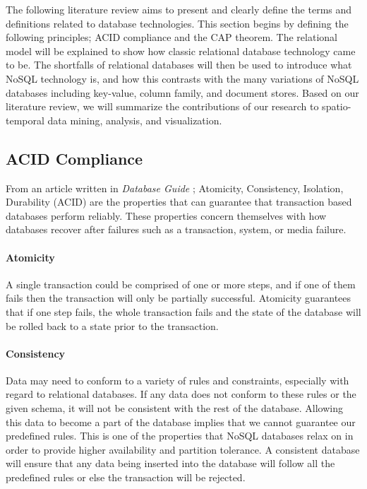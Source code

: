 The following literature review aims to present and clearly define the terms and definitions related to database technologies. This section begins by defining the following principles; ACID compliance and the CAP theorem. The relational model will be explained to show how classic relational database technology came to be. The shortfalls of relational databases will then be used to introduce what NoSQL technology is, and how this contrasts with the many variations of NoSQL databases including key-value, column family, and document stores. Based on our literature review, we will summarize the contributions of our research to spatio-temporal data mining, analysis, and visualization.

\subsection{ACID Compliance}
\label{sec:acid}

From an article written in \emph{Database Guide} \cite{acid}; Atomicity, Consistency, Isolation, Durability (ACID) are the properties that can guarantee that transaction based databases perform reliably. These properties concern themselves with how databases recover after failures such as a transaction, system, or media failure.

\paragraph{Atomicity}
A single transaction could be comprised of one or more steps, and if one of them fails then the transaction will only be partially successful. Atomicity guarantees that if one step fails, the whole transaction fails and the state of the database will be rolled back to a state prior to the transaction.

\paragraph{Consistency}
Data may need to conform to a variety of rules and constraints, especially with regard to relational databases. If any data does not conform to these rules or the given schema, it will not be consistent with the rest of the database. Allowing this data to become a part of the database implies that we cannot guarantee our predefined rules. This is one of the properties that NoSQL databases relax on in order to provide higher availability and partition tolerance. A consistent database will ensure that any data being inserted into the database will follow all the predefined rules or else the transaction will be rejected.

